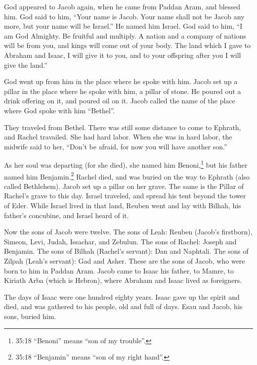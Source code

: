\myverse{}God appeared to Jacob again, when he came from Paddan Aram, and blessed him.   \myverse{}God said to him, “Your name is Jacob. Your name shall not be Jacob any more, but your name will be Israel.” He named him Israel.   \myverse{}God said to him, “I am God Almighty. Be fruitful and multiply. A nation and a company of nations will be from you, and kings will come out of your body.   \myverse{}The land which I gave to Abraham and Isaac, I will give it to you, and to your offspring after you I will give the land.”

\myverse{}God went up from him in the place where he spoke with him.   \myverse{}Jacob set up a pillar in the place where he spoke with him, a pillar of stone. He poured out a drink offering on it, and poured oil on it.   \myverse{}Jacob called the name of the place where God spoke with him “Bethel”.

\myverse{}They traveled from Bethel. There was still some distance to come to Ephrath, and Rachel travailed. She had hard labor.   \myverse{}When she was in hard labor, the midwife said to her, “Don’t be afraid, for now you will have another son.”

\myverse{}As her soul was departing (for she died), she named him Benoni,\footnote{35:18 “Benoni” means “son of my trouble”.} but his father named him Benjamin.\footnote{35:18 “Benjamin” means “son of my right hand”.}   \myverse{}Rachel died, and was buried on the way to Ephrath (also called Bethlehem).   \myverse{}Jacob set up a pillar on her grave. The same is the Pillar of Rachel’s grave to this day.   \myverse{}Israel traveled, and spread his tent beyond the tower of Eder.   \myverse{}While Israel lived in that land, Reuben went and lay with Bilhah, his father’s concubine, and Israel heard of it.

Now the sons of Jacob were twelve.   \myverse{}The sons of Leah: Reuben (Jacob’s firstborn), Simeon, Levi, Judah, Issachar, and Zebulun.   \myverse{}The sons of Rachel: Joseph and Benjamin.   \myverse{}The sons of Bilhah (Rachel’s servant): Dan and Naphtali.   \myverse{}The sons of Zilpah (Leah’s servant): Gad and Asher. These are the sons of Jacob, who were born to him in Paddan Aram.   \myverse{}Jacob came to Isaac his father, to Mamre, to Kiriath Arba (which is Hebron), where Abraham and Isaac lived as foreigners.

\myverse{}The days of Isaac were one hundred eighty years.   \myverse{}Isaac gave up the spirit and died, and was gathered to his people, old and full of days. Esau and Jacob, his sons, buried him.


